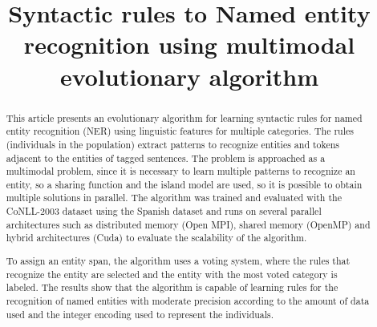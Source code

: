 \documentclass{IEEEtran}
\begin{document}
%
\title{Syntactic rules to Named entity recognition using multimodal evolutionary algorithm}

\author{
}


\maketitle

\begin{abstract}

  This article presents an evolutionary algorithm for learning syntactic rules for named entity recognition (NER) using linguistic features for multiple categories. The rules (individuals in the population) extract patterns to recognize entities and tokens adjacent to the entities of tagged sentences. The problem is approached as a multimodal problem, since it is necessary to learn multiple patterns to recognize an entity, so a sharing function and the island model are used, so it is possible to obtain multiple solutions in parallel. The algorithm was trained and evaluated with the CoNLL-2003 dataset using the Spanish dataset and runs on several parallel architectures such as distributed memory (Open MPI), shared memory (OpenMP) and hybrid architectures (Cuda) to evaluate the scalability of the algorithm.

  To assign an entity span, the algorithm uses a voting system, where the rules that recognize the entity are selected and the entity with the most voted category is labeled. The results show that the algorithm is capable of learning rules for the recognition of named entities with moderate precision according to the amount of data used and the integer encoding used to represent the individuals.

\end{abstract}

\end{document}
